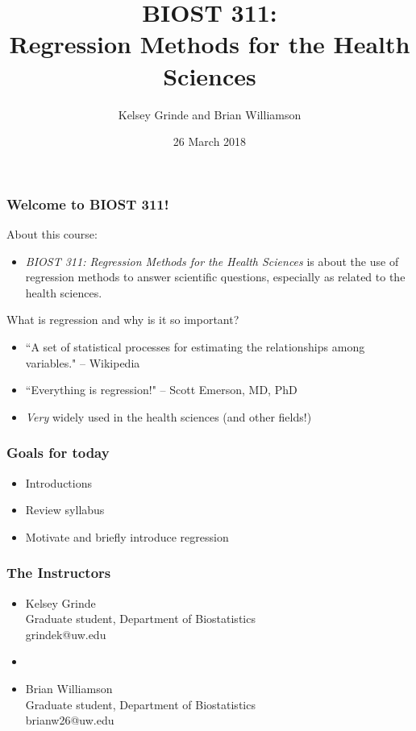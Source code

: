 \documentclass[12pt, 
hyperref={colorlinks=true, linkcolor=blue, urlcolor=cyan}]{beamer}
\title{BIOST 311: \\ Regression Methods for the Health Sciences}
\author{Kelsey Grinde and Brian Williamson}
\institute{UW Biostatistics}
\date{26 March 2018}
\begin{document}
\begin{frame}
\titlepage\thispagestyle{empty}
\end{frame}


\setcounter{framenumber}{\value{day1}}

\begin{frame}
\frametitle{Welcome to BIOST 311!}

About this course:
\begin{itemize}
\item[] \textit{BIOST 311: Regression Methods for the Health Sciences} is about the use of regression methods to answer scientific questions, especially as related to the health sciences.
\end{itemize}

What is regression and why is it so important?
\begin{itemize}
\item ``A set of statistical processes for estimating the relationships among variables." -- Wikipedia
\item ``Everything is regression!" -- Scott Emerson, MD, PhD
\item \textit{Very} widely used in the health sciences (and other fields!)
\end{itemize}

\end{frame}

\begin{frame}
\frametitle{Goals for today}

\begin{itemize}
\item Introductions
\item Review syllabus
\item Motivate and briefly introduce regression
\end{itemize}

\end{frame}

\begin{frame}
\frametitle{The Instructors}
\begin{itemize}
\item[] Kelsey Grinde \\ Graduate student, Department of Biostatistics \\ grindek@uw.edu 
\item[]
\item[] Brian Williamson \\ Graduate student, Department of Biostatistics \\ brianw26@uw.edu
\end{itemize}
\end{frame}
\end{document}
